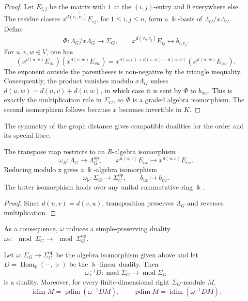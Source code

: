 \documentclass[a4paper,leqno]{amsart}
\begin{document}
\begin{proof}
Let $E_{i,j}$ be the matrix with $1$ at the $(i,j)$-entry and $0$ everywhere else.  The residue classes
$\overline{x^{d(v_i,v_j)}E_{ij}}$, for $1\leq i,j\leq n$,
form a $\Bbbk$-basis of $\Lambda_G/x\Lambda_G$.  Define
\[
\Phi:\Lambda_G/x\Lambda_G\longrightarrow\Sigma_G,
\qquad
\overline{x^{d(v_i,v_j)}E_{ij}}\longmapsto b_{v_i v_j}.
\]
For $u,v,w\in V$, one has
\[
(x^{d(u,v)}E_{uv})(x^{d(v,w)}E_{vw})
=x^{d(u,v)+d(v,w)-d(u,w)}
 (x^{d(u,w)}E_{uw}).
\]
The exponent outside the parentheses is non-negative by the triangle
inequality.  Consequently, the product vanishes modulo
$x\Lambda_G$ unless
$d(u,w)=d(u,v)+d(v,w)$, in which case it is sent by $\Phi$ to
$b_{uw}$.  This is exactly the multiplication rule in $\Sigma_G$,
so $\Phi$ is a graded algebra isomorphism.  The second isomorphism
follows because $x$ becomes invertible in $K$.
\end{proof}

The symmetry of the graph distance gives compatible dualities for the order and its special fibre.

\begin{lem}\label{lem:anti-iso}
The transpose map restricts to an $R$-algebra isomorphism
\[
\omega_R:\Lambda_G\longrightarrow\Lambda_G^{\operatorname{op}},
\qquad
x^{d(u,v)}E_{uv}\longmapsto x^{d(u,v)}E_{vu}.
\]
Reducing modulo x gives a $\Bbbk$-algebra isomorphism
\[
\omega_{\Bbbk}:\Sigma_G\longrightarrow
\Sigma_G^{\operatorname{op}},
\qquad
b_{uv}\longmapsto b_{vu}.
\]
The latter isomorphism holds over any unital commutative ring $\Bbbk$.
\end{lem}

\begin{proof}
Since $d(u,v)=d(v,u)$, transposition preserves $\Lambda_G$ and
reverses multiplication.
\end{proof}

As a consequence, $\omega$ induces  a simple-preserving duality $\omega_*:\mod \Sigma_G \to \mod \Sigma_G^{\operatorname{op}}$.

\begin{prop}\label{prop:dual-functor}
Let $\omega:\Sigma_G\rightarrow \Sigma_G^{\operatorname{op}}$
be the algebra isomorphism given above and let $D=\operatorname{Hom}_{\Bbbk}(-,\Bbbk)$ be the $\Bbbk$-linear duality. Then
$$\omega_*^{-1}D:\operatorname{mod} \Sigma_G\longrightarrow \operatorname{mod} \Sigma_G$$ is a duality. Moreover, for every finite-dimensional right $\Sigma_G$-module $M$, 
$$\operatorname{idim}M=\operatorname{pdim}(\omega^{-1}DM),
\qquad\operatorname{pdim}M=\operatorname{idim}(\omega^{-1}DM).$$
\end{prop}
\end{document}
